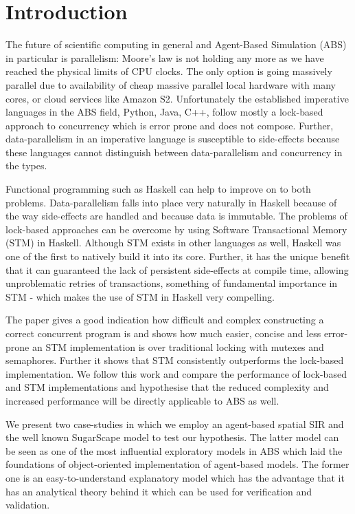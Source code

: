 \section{Introduction} %
The future of scientific computing in general and Agent-Based Simulation (ABS) in particular is parallelism: Moore's law is not holding any more as we have reached the physical limits of CPU clocks. The only option is going massively parallel due to availability of cheap massive parallel local hardware with many cores, or cloud services like Amazon S2. Unfortunately the established imperative languages in the ABS field, Python, Java, C++, follow mostly a lock-based approach to concurrency which is error prone and does not compose. Further, data-parallelism in an imperative language is susceptible to side-effects because these languages cannot distinguish between data-parallelism and concurrency in the types. 

Functional programming such as Haskell can help to improve on to both problems. Data-parallelism falls into place very naturally in Haskell because of the way side-effects are handled and because data is immutable. The problems of lock-based approaches can be overcome by using Software Transactional Memory (STM) in Haskell. Although STM exists in other languages as well, Haskell was one of the first to natively build it into its core. Further, it has the unique benefit that it can guaranteed the lack of persistent side-effects at compile time, allowing unproblematic retries of transactions, something of fundamental importance in STM - which makes the use of STM in Haskell very compelling.

The paper \cite{discolo_lock_2006} gives a good indication how difficult and complex constructing a correct concurrent program is and shows how much easier, concise and less error-prone an STM implementation is over traditional locking with mutexes and semaphores. Further it shows that STM consistently outperforms the lock-based implementation. We follow this work and compare the performance of lock-based and STM implementations and hypothesise that the reduced complexity and increased performance will be directly applicable to ABS as well.

We present two case-studies in which we employ an agent-based spatial SIR \citep{macal_agent-based_2010, thaler_pure_2019} and the well known SugarScape \citep{epstein_growing_1996} model to test our hypothesis. The latter model can be seen as one of the most influential exploratory models in ABS which laid the foundations of object-oriented implementation of agent-based models. The former one is an easy-to-understand explanatory model which has the advantage that it has an analytical theory behind it which can be used for verification and validation. 

